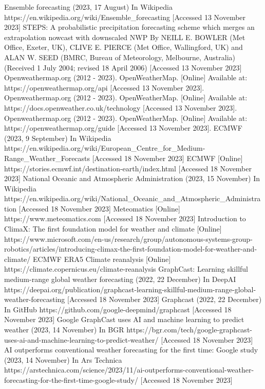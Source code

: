 \documentclass[../paper.tex]{subfiles}
\begin{document}
\begin{thebibliography}{00}
     Ensemble forecasting (2023, 17 August) In Wikipedia https://en.wikipedia.org/wiki/Ensemble\_forecasting [Accessed 13 November 2023]
     STEPS:
    A probabilistic precipitation forecasting scheme which merges an extrapolation nowcast with downscaled NWP
    By NEILL E. BOWLER (Met Office, Exeter, UK), CLIVE E. PIERCE (Met Office, Wallingford, UK) and ALAN W. SEED (BMRC,
    Bureau of Meteorology, Melbourne, Australia)
    (Received 1 July 2004; revised 18 April 2006) [Accessed 13 November 2023]
     Openweathermap.org (2012 - 2023).
    OpenWeatherMap.
    [Online] Available at: https://openweathermap.org/api [Accessed 13 November 2023].
     Openweathermap.org (2012 - 2023).
    OpenWeatherMap.
    [Online] Available at: https://docs.openweather.co.uk/technology [Accessed 13 November 2023].
     Openweathermap.org (2012 - 2023).
    OpenWeatherMap.
    [Online] Available at: https://openweathermap.org/guide [Accessed 13 November 2023].
     ECMWF (2023, 9 September) In Wikipedia https://en.wikipedia.org/wiki/European\_Centre\_for\_Medium-Range\_Weather\_Forecasts [Accessed 18 November 2023]
     ECMWF [Online] https://stories.ecmwf.int/destination-earth/index.html [Accessed 18 November 2023]
     National Oceanic and Atmospheric Administration (2023, 15 November) In Wikipedia
    https://en.wikipedia.org/wiki/National\_Oceanic\_and\_Atmospheric\_Administration [Accessed 18 November 2023]
     Meteomatics [Online] https://www.meteomatics.com [Accessed 18 November 2023]
     Introduction to ClimaX: The first foundation model for weather and climate [Online] https://www.microsoft.com/en-us/research/group/autonomous-systems-group-robotics/articles/introducing-climax-the-first-foundation-model-for-weather-and-climate/
     ECMWF ERA5 Climate reanalysis [Online] https://climate.copernicus.eu/climate-reanalysis
     GraphCast: Learning skillful medium-range global weather forecasting (2022, 22 December) In DeepAI https://deepai.org/publication/graphcast-learning-skillful-medium-range-global-weather-forecasting [Accessed 18 November 2023]
     Graphcast (2022, 22 December) In GitHub https://github.com/google-deepmind/graphcast [Accessed 18 November 2023]
     Google GraphCast uses AI and machine learning to predict weather (2023, 14 November) In BGR https://bgr.com/tech/google-graphcast-uses-ai-and-machine-learning-to-predict-weather/ [Accessed 18 November 2023]
     AI outperforms conventional weather forecasting for the first time: Google study (2023, 14 November) In Ars Technica https://arstechnica.com/science/2023/11/ai-outperforms-conventional-weather-forecasting-for-the-first-time-google-study/ [Accessed 18 November 2023]
\end{thebibliography}
\end{document}
